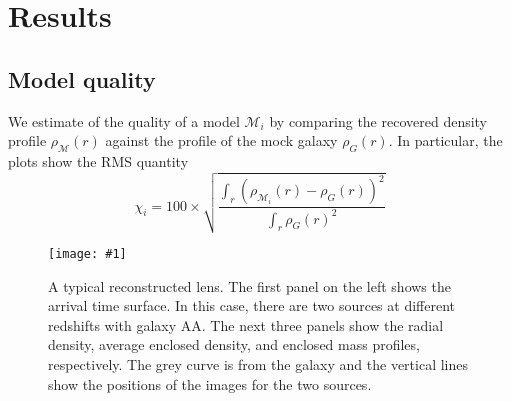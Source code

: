 \documentclass[onecolumn,galley]{mn2e}
\newcommand{\M}{\ensuremath{\mathscr{M}}}
\newcommand\plotone[1]{%
 \centering
 \leavevmode
 \texttt{[image: \#1]}%
}%
\begin{document}
%

\section{Results} %

\subsection{Model quality}
We estimate of the quality of a model $\M_i$ by comparing the recovered
density profile $\rho_\M(r)$ against the profile of the mock galaxy $\rho_G(r)$.
In particular, the plots show the RMS quantity
%
\begin{equation}
  \chi_i = 100 \times \sqrt{\frac{\int_r (\rho_{\M_i}(r) - \rho_G(r))^2}{\int_r \rho_G(r)^2}}
\end{equation}



\begin{figure}
\plotone{AAZContrastR1R5_Tm.pdf}
\caption{A typical reconstructed lens. The first panel on the left shows the
arrival time surface. In this case, there are two sources at different
redshifts with galaxy AA. The next three panels show the radial density,
average enclosed density, and enclosed mass profiles, respectively.  The grey
curve is from the galaxy and the vertical lines show the positions of the
images for the two sources.}
\end{figure}
\end{document}
